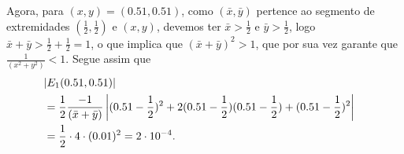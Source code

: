 \begin{example}
    Agora, para \((x,y)=(0.51,0.51)\), como \((\bar{x},\bar{y})\) pertence ao segmento de extremidades \((\frac{1}{2},\frac{1}{2})\) e \((x,y)\), devemos ter \(\bar{x}>\frac{1}{2}\) e \(\bar{y}>\frac{1}{2}\), logo \(\bar{x} + \bar{y} > \frac{1}{2} + \frac{1}{2} = 1\), o que implica que \((\bar{x}+\bar{y})^2 > 1\), que por sua vez garante que \(\frac{1}{(x^2+y^2)} < 1\). Segue assim que
        \begin{align*}
            {\lefteqn{|E_1(0.51,0.51)|}}\\
                & = \frac{1}{2} \frac{-1}{(\bar{x}+\bar{y})}\left| (0.51 -\frac{1}{2})^2 + 2(0.51-\frac{1}{2})(0.51-\frac{1}{2}) + (0.51-\frac{1}{2})^2 \right| \\
                & = \frac{1}{2}\cdot 4\cdot (0.01)^2 = 2\cdot10^{-4}.
        \end{align*}
\end{example}

